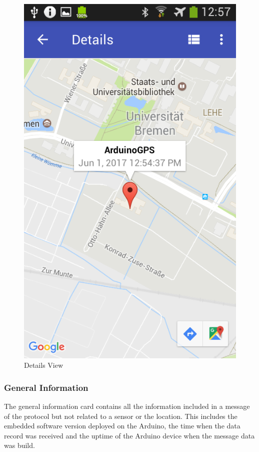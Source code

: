 \begin{figure}[h]
\begin{minipage}{.33\textwidth}
  \includegraphics[width=.95\linewidth]{src/details_map.png}
\end{minipage}
  \caption{Details View}
  \label{fig:details_view}
\end{figure}

\subsubsection{General Information}
The general information card contains all the information included in a message of the protocol but not related to a sensor or the location. This includes the embedded software version deployed on the Arduino, the time when the data record was received and the uptime of the Arduino device when the message data was build.

